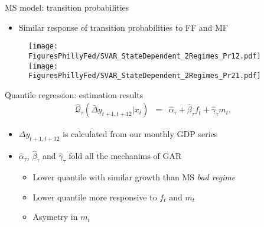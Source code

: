 \documentclass[xcolor=dvipsnames, xcolor=table, 10pt]{beamer}
\begin{document}
\begin{frame}{MS model: transition probabilities}
\begin{itemize}
\item Similar response of transition probabilities to FF and MF
\end{itemize}
\begin{figure}
    \texttt{[image: FiguresPhillyFed/SVAR\_StateDependent\_2Regimes\_Pr12.pdf]}
    \texttt{[image: FiguresPhillyFed/SVAR\_StateDependent\_2Regimes\_Pr21.pdf]}
\end{figure}


\end{frame}


\begin{frame}{Quantile regression: estimation results}
\label{app:qrmodel}
\begin{eqnarray*}
\widehat{\mathcal{Q}}_{\tau}(\bar{\Delta} {y}_{t+1,t+12}|x_t) &=& \hat{\alpha}_{\tau} + \hat{\beta}_{\tau} f_t + \hat{\gamma}_{\tau} m_t, \label{eq:GAR}
\end{eqnarray*}

\begin{itemize}
\item $\Delta {y}_{t+1,t+12}$ is calculated from our monthly GDP series
\medskip
\item $\hat{\alpha}_\tau$, $\hat{\beta}_\tau$ and $\hat{\gamma}_\tau$ fold all the mechanims of GAR
  \begin{itemize}
    \medskip
     \item Lower quantile with similar growth than MS \textit{bad regime}
       \medskip
     \item Lower quantile more responsive to $f_t$ and $m_t$
       \medskip
       \item Asymetry in $m_t$
  \end{itemize}
\end{itemize}


\end{frame}
\end{document}
